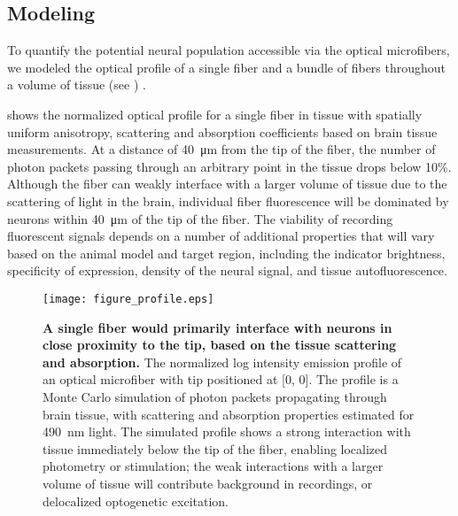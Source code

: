 \subsection{Modeling}

To quantify the potential neural population accessible via the 
optical microfibers, we modeled the optical profile of a single 
fiber and a bundle of fibers throughout a volume of tissue 
(see ) \cite{Boas:2002ue}.

 shows the normalized optical profile for a single fiber 
in tissue with spatially uniform anisotropy, scattering and 
absorption coefficients based on brain tissue measurements. At 
a distance of 40~\si{\micro\meter} from the tip of the fiber, the number of photon 
packets passing through an arbitrary point 
in the tissue drops below 10\%. Although the fiber can weakly interface with a 
larger volume of tissue due to the scattering of light in the 
brain, individual fiber fluorescence will be dominated 
by neurons within 40~\si{\micro\meter} of the tip of the fiber. The viability of 
recording fluorescent signals depends on a number of additional 
properties that will vary based on the animal model and target 
region, including the indicator brightness, specificity of 
expression, density of the neural signal, and tissue 
autofluorescence.

\begin{figure}
\texttt{[image: figure\_profile.eps]}
\caption[Profile of single fiber.]{\textbf{A single fiber would primarily interface with 
neurons in close proximity to the tip, based on the tissue 
scattering and absorption.} The normalized log intensity 
emission profile of an optical microfiber with tip 
positioned at [0, 0]. The profile is a Monte Carlo 
simulation of photon packets propagating through 
brain tissue, with scattering and absorption properties 
estimated for 490~nm light. The simulated profile shows 
a strong interaction with tissue immediately below the 
tip of the fiber, enabling localized photometry or 
stimulation; the weak interactions with a larger volume 
of tissue will contribute background in recordings, or 
delocalized optogenetic excitation.}
\label{fig:profile}
\end{figure}


